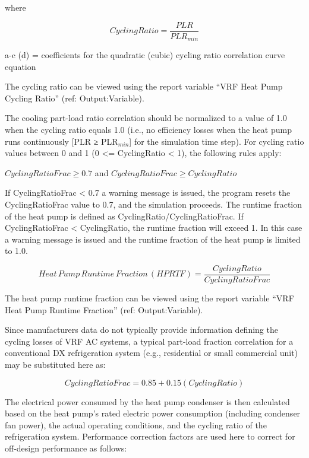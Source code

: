 where

\begin{equation}
  CyclingRatio = \frac{PLR}{PLR_{min}}
\end{equation}

a-c (d) = coefficients for the quadratic (cubic) cycling ratio correlation curve equation

The cycling ratio can be viewed using the report variable ``VRF Heat Pump Cycling Ratio'' (ref: Output:Variable).

The cooling part-load ratio correlation should be normalized to a value of 1.0 when the cycling ratio equals 1.0 (i.e., no efficiency losses when the heat pump runs continuously [PLR ≥ PLR\(_{min}\)] for the simulation time step). For cycling ratio values between 0 and 1 (0 <= CyclingRatio < 1), the following rules apply:

\(CyclingRatioFrac \ge 0.7\) and \(CyclingRatioFrac \ge CyclingRatio\)

If CyclingRatioFrac < 0.7 a warning message is issued, the program resets the CyclingRatioFrac value to 0.7, and the simulation proceeds. The runtime fraction of the heat pump is defined as CyclingRatio/CyclingRatioFrac. If CyclingRatioFrac < CyclingRatio, the runtime fraction will exceed 1. In this case a warning message is issued and the runtime fraction of the heat pump is limited to 1.0.

\begin{equation}
  Heat\,Pump\,Runtime\,Fraction\,(HPRTF) = \frac{CyclingRatio}{CyclingRatioFrac}
\end{equation}

The heat pump runtime fraction can be viewed using the report variable ``VRF Heat Pump Runtime Fraction'' (ref: Output:Variable).

Since manufacturers data do not typically provide information defining the cycling losses of VRF AC systems, a typical part-load fraction correlation for a conventional DX refrigeration system (e.g., residential or small commercial unit) may be substituted here as:

\begin{equation}
  CyclingRatioFrac = 0.85 + 0.15(CyclingRatio)
\end{equation}

The electrical power consumed by the heat pump condenser is then calculated based on the heat pump's rated electric power consumption (including condenser fan power), the actual operating conditions, and the cycling ratio of the refrigeration system. Performance correction factors are used here to correct for off-design performance as follows:

